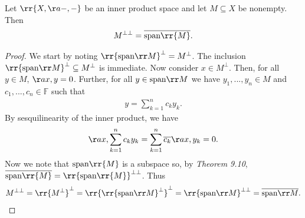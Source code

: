 \documentclass{article}
\begin{document}
\begin{claim*}[8]
  Let $\rr{X,\aa{-,-}}$ be an inner product space and let $M\subseteq X$ be nonempty. Then
  \begin{align*}
    M^{\bot\bot}=\overline{\text{span}\rr{M}}.
  \end{align*}
  \begin{proof}
    We start by noting $\rr{\text{span}\rr M}^\bot = M^\bot$. The inclusion $\rr{\text{span}\rr M}^\bot\subseteq M^\bot$
    is immediate. Now consider $x\in M^{\bot}$. Then, for all $y\in M$, $\aa{x,y}=0$. Further, for all
    $y\in\text{span}\rr M$ we have $y_1,...,y_n\in M$ and $c_1,...,c_n\in\mathbb F$ such that
    \begin{align*}
      y=\sum_{k=1}^{n} c_ky_k.
    \end{align*}
    By sesquilinearity of the inner product, we have
    \begin{align*}
      \aa{x,\sum_{k=1}^{n} c_ky_k} = \sum_{k=1}^n \overline{c_k}\aa{x,y_k} = 0.
    \end{align*}
    Now we note that $\text{span}\rr{M}$ is a subspace so, by \emph{Theorem 9.10},
    $\overline{\text{span}\rr{M}}=\rr{\text{span}\rr{M}}^{\bot\bot}$.
    Thus
    \begin{align*}
      M^{\bot\bot}=\rr{M^\bot}^\bot=\rr{\rr{\text{span}\rr M}^\bot}^\bot = \rr{\text{span}\rr M}^{\bot\bot}=\overline{\text{span}\rr M}.
    \end{align*}
  \end{proof}
\end{claim*}
\end{document}
